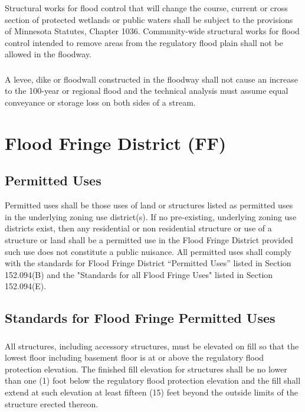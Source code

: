 \subsubsection{}
Structural works for flood control that will change the course, current or cross section of protected wetlands or public waters shall be subject to the provisions of Minnesota Statutes, Chapter 1036. Community-wide structural works for flood control intended to remove areas from the regulatory flood plain shall not be allowed in the floodway.
\subsubsection{}
A levee, dike or floodwall constructed in the floodway shall not cause an increase to the 100-year or regional flood and the technical analysis must assume equal conveyance or storage loss on both sides of a stream.

\section{Flood Fringe District (FF)}
\subsection{Permitted Uses}
Permitted uses shall be those uses of land or structures listed as permitted uses in the underlying zoning use district(s). If no pre-existing, underlying zoning use districts exist, then any residential or non residential structure or use of a structure or land shall be a permitted use in the Flood Fringe District provided such use does not constitute a public nuisance. All permitted uses shall comply with the standards for Flood Fringe District “Permitted Uses” listed in Section 152.094(B) and the "Standards for all Flood Fringe Uses" listed in Section 152.094(E).
\subsection{Standards for Flood Fringe Permitted Uses}
\subsubsection{}
All structures, including accessory structures, must be elevated on fill so that the lowest floor including basement floor is at or above the regulatory flood protection elevation. The finished fill elevation for structures shall be no lower than one (1) foot below the regulatory flood protection elevation and the fill shall extend at such elevation at least fifteen (15) feet beyond the outside limits of the structure erected thereon.
